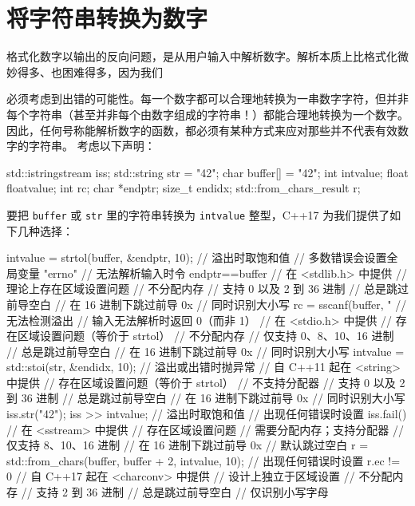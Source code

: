 \section{将字符串转换为数字}

格式化数字以输出的反向问题，是从用户输入中解析数字。解析本质上比格式化微妙得多、也困难得多，因为我们

必须考虑到出错的可能性。每一个数字都可以合理地转换为一串数字字符，但并非每个字符串（甚至并非每个由数字组成的字符串！）都能合理地转换为一个数字。因此，任何号称能解析数字的函数，都必须有某种方式来应对那些并不代表有效数字的字符串。
考虑以下声明：

\begin{codebox}[cpp]
     std::istringstream iss;
     std::string str = "42";
     char buffer[] = "42";
     int intvalue;
     float floatvalue;
     int rc;
     char *endptr;
     size_t endidx;
     std::from_chars_result r;
\end{codebox}

要把 \texttt{buffer} 或 \texttt{str} 里的字符串转换为 \texttt{intvalue} 整型，C++17 为我们提供了如下几种选择：

\begin{codebox}[cpp]
     intvalue = strtol(buffer, &endptr, 10);
       // 溢出时取饱和值
       // 多数错误会设置全局变量 "errno"
       // 无法解析输入时令 endptr==buffer
       // 在 <stdlib.h> 中提供
       // 理论上存在区域设置问题
       // 不分配内存
       // 支持 0 以及 2 到 36 进制
       // 总是跳过前导空白
       // 在 16 进制下跳过前导 0x
       // 同时识别大小写
     rc = sscanf(buffer, "%
       // 无法检测溢出
       // 输入无法解析时返回 0（而非 1）
       // 在 <stdio.h> 中提供
       // 存在区域设置问题（等价于 strtol）
       // 不分配内存
       // 仅支持 0、8、10、16 进制
       // 总是跳过前导空白
       // 在 16 进制下跳过前导 0x
       // 同时识别大小写
     intvalue = std::stoi(str, &endidx, 10);
       // 溢出或出错时抛异常
       // 自 C++11 起在 <string> 中提供
       // 存在区域设置问题（等价于 strtol）
       // 不支持分配器
       // 支持 0 以及 2 到 36 进制
       // 总是跳过前导空白
       // 在 16 进制下跳过前导 0x
       // 同时识别大小写
     iss.str("42");
     iss >> intvalue;
       // 溢出时取饱和值
       // 出现任何错误时设置 iss.fail()
       // 在 <sstream> 中提供
       // 存在区域设置问题
       // 需要分配内存；支持分配器
       // 仅支持 8、10、16 进制
       // 在 16 进制下跳过前导 0x
       // 默认跳过空白
     r = std::from_chars(buffer, buffer + 2, intvalue, 10);
       // 出现任何错误时设置 r.ec != 0
       // 自 C++17 起在 <charconv> 中提供
       // 设计上独立于区域设置
       // 不分配内存
       // 支持 2 到 36 进制
       // 总是跳过前导空白
       // 仅识别小写字母
\end{codebox}

